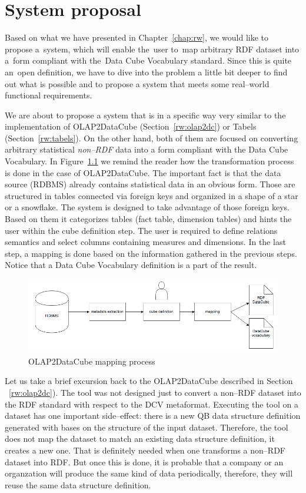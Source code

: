 \chapter{System proposal}
\label{ch:proposal}
Based on what we have presented in Chapter~\ref{chap:rw}, we would like to~
propose a~system, which will enable the~user to~map arbitrary RDF dataset
into a~form compliant with the~Data Cube Vocabulary standard. Since this is 
quite an~open definition, we have to dive into the problem a little bit deeper to 
find out what is possible and to propose a system that meets some real--world 
functional requirements.

We are about to propose a system that is in a specific way very similar to 
the implementation of OLAP2DataCube (Section~\ref{rw:olap2dc}) or Tabels (Section~\ref{rw:tabels}).
On the other hand, both of them are 
focused on converting arbitrary statistical \emph{non--RDF} data into a form 
compliant with the Data Cube Vocabulary. In Figure~\ref{fig:olap2dc-mapping} we remind
the reader how the transformation process is done in the case of OLAP2DataCube.
The important fact is that the data source (RDBMS) already contains statistical data in an obvious form. 
Those are structured in tables connected via foreign keys and organized in a 
shape of a star or a snowflake. The system is designed to take advantage of those 
foreign keys. Based on them it categorizes tables (fact table, dimension tables) and hints
the user within the cube definition step.
The user is required to define relations semantics and select columns 
containing measures and dimensions. In the last step, a 
mapping is done based on the information gathered in the previous steps.
Notice that a Data Cube Vocabulary definition is a part of the result.


\begin{figure}
	\centering
	\includegraphics[width=140mm]{img/mapping-olap2dc.png}
	\caption{OLAP2DataCube mapping process}
	\label{fig:olap2dc-mapping}
\end{figure}


Let us take a brief excursion back to the OLAP2DataCube described in Section 
~\ref{rw:olap2dc}). The tool was not designed just to convert a non--RDF dataset 
into the RDF standard with respect to the DCV metaformat. Executing the tool on a 
dataset has one important side--effect: there is a new QB data structure definition
generated with bases on 
the structure of the input dataset. Therefore, the tool does not map the 
dataset to match an existing data structure definition, it creates a new one. That is definitely
needed when one transforms a non--RDF dataset into RDF. But once 
this is done, it is probable that a company or an organzation will produce the 
same kind of data periodically, therefore, they will reuse the same data structure definition.

